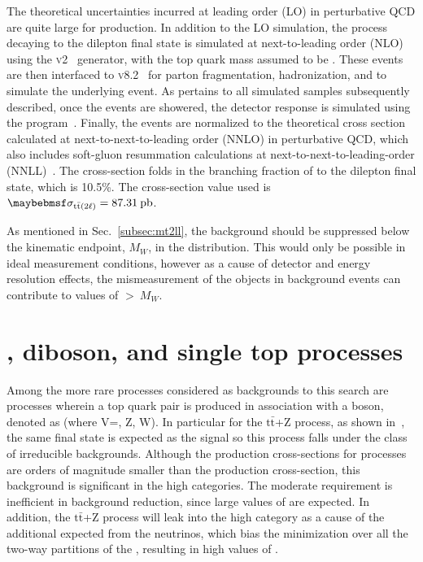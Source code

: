 The theoretical uncertainties incurred at leading order (LO) in perturbative QCD are quite large for \ttbar production. In addition to the LO simulation, the \ttbar process decaying to the dilepton final state is simulated at next-to-leading order (NLO) using the \POWHEG \textsc{v2}~\cite{powheg,powheg2} generator, with the top quark mass assumed to be \:\GeV. These events are then interfaced to \Pythia \textsc{v8.2}~\cite{Sjostrand:2014zea} for parton fragmentation, hadronization, and to simulate the underlying event. As pertains to all simulated samples subsequently described, once the \ttll events are showered, the detector response is simulated using the  program~\cite{AGOSTINELLI2003250}. Finally, the \ttll events are normalized to the theoretical cross section calculated at next-to-next-to-leading order (NNLO) in perturbative QCD, which also includes soft-gluon resummation calculations at next-to-next-to-leading-order (NNLL)~\cite{ttxsec1,ttxsec2,ttxsec3,ttxsec4,ttxsec5}. The cross-section folds in the branching fraction of \ttbar to the dilepton final state, which is 10.5\%. The cross-section value used is $\sigma_{\ttll}=87.31\:\mathrm{pb}$.

As mentioned in Sec.~\ref{subsec:mt2ll}, the \ttll background should be suppressed below the kinematic endpoint, $M_W$, in the \mttll distribution. This would only be possible in ideal measurement conditions, however as a cause of detector and energy resolution effects, the mismeasurement of the objects in \ttll background events can contribute to values of \mttll$>\:M_W$. 

\section{\ttV, diboson, and single top processes}
\label{sec:ttVetc}
Among the more rare processes considered as backgrounds to this search are processes wherein a top quark pair is produced in association with a boson, denoted as \ttV (where V=\gamma, Z, W). In particular for the $\mathrm{t\bar{t}}$+Z process, as shown in~, the same final state is expected as the signal so this process falls under the class of irreducible backgrounds. Although the production cross-sections for \ttV processes are orders of magnitude smaller than the \ttbar production cross-section, this background is significant in the high \mttll categories. The moderate \ptmiss requirement is inefficient in \ttV background reduction, since large values of \ptmiss are expected. In addition, the $\mathrm{t\bar{t}}$+Z process will leak into the high \mttll category as a cause of the additional expected \ptmiss from the neutrinos, which bias the minimization over all the two-way partitions of the \ptmiss, resulting in high values of \mttll.

